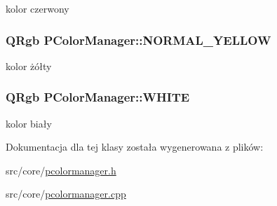 kolor czerwony \hypertarget{classPColorManager_a1086408be008b97df57f579702d624e}{
\subsubsection[{NORMAL\_\-YELLOW}]{\setlength{\rightskip}{0pt plus 5cm}QRgb {\bf PColorManager::NORMAL\_\-YELLOW}}}
\label{classPColorManager_a1086408be008b97df57f579702d624e}


kolor żółty \hypertarget{classPColorManager_c15cc3f24bec369e9e30fee77ca8899a}{
\subsubsection[{WHITE}]{\setlength{\rightskip}{0pt plus 5cm}QRgb {\bf PColorManager::WHITE}}}
\label{classPColorManager_c15cc3f24bec369e9e30fee77ca8899a}


kolor biały 

Dokumentacja dla tej klasy została wygenerowana z plików:\begin{CompactItemize}
\item 
src/core/\hyperlink{pcolormanager_8h}{pcolormanager.h}\item 
src/core/\hyperlink{pcolormanager_8cpp}{pcolormanager.cpp}\end{CompactItemize}

